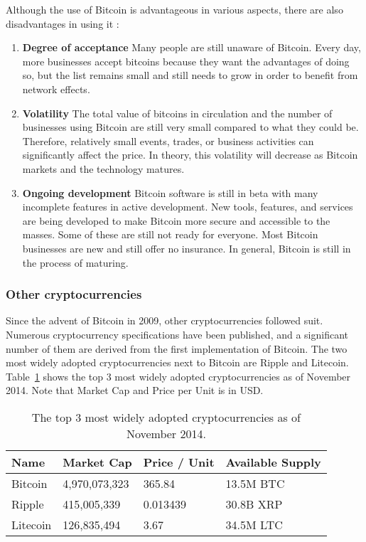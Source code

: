 \documentclass{acm_proc_article-sp}
\begin{document}
Although the use of Bitcoin is advantageous in various aspects, there are also disadvantages in using it \cite{Bitcoin:2014}:
\begin{enumerate}
	\item \textbf{Degree of acceptance} Many people are still unaware of Bitcoin. Every day, more businesses accept bitcoins because they want the advantages of doing so, but the list remains small and still needs to grow in order to benefit from network effects.
	\item \textbf{Volatility} The total value of bitcoins in circulation and the number of businesses using Bitcoin are still very small compared to what they could be. Therefore, relatively small events, trades, or business activities can significantly affect the price. In theory, this volatility will decrease as Bitcoin markets and the technology matures.
	\item \textbf{Ongoing development} Bitcoin software is still in beta with many incomplete features in active development. New tools, features, and services are being developed to make Bitcoin more secure and accessible to the masses. Some of these are still not ready for everyone. Most Bitcoin businesses are new and still offer no insurance. In general, Bitcoin is still in the process of maturing.
\end{enumerate}


\subsubsection{Other cryptocurrencies}
Since the advent of Bitcoin in 2009, other cryptocurrencies followed suit. Numerous cryptocurrency specifications have been published, and a significant number of them are derived from the first implementation of Bitcoin. The two most widely adopted cryptocurrencies next to Bitcoin are Ripple and Litecoin. Table~\ref{cryptocurrencies} shows the top 3 most widely adopted cryptocurrencies as of November 2014. Note that Market Cap and Price per Unit is in USD.


\begin{table}[h]
\centering
\begin{tabular}{ | l | l | l | l | }
\hline
  Name & Market Cap & Price / Unit & Available Supply \\ \hline 
  Bitcoin   & 4,970,073,323 & 365.84 & 13.5M BTC \\ \hline
  Ripple    & 415,005,339 & 0.013439 & 30.8B XRP \\ \hline
  Litecoin  & 126,835,494 & 3.67 & 34.5M LTC \\ \hline
\end{tabular}
  \caption{The top 3 most widely adopted cryptocurrencies as of November 2014. }
  \label{cryptocurrencies}
\end{table}
\end{document}
